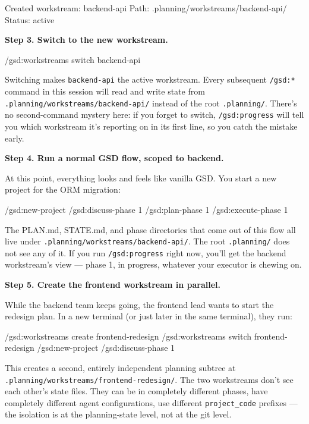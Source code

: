 \documentclass[11pt,letterpaper,openany]{book}
\begin{document}
\begin{gsdscenario}
\begin{gsdplain}
Created workstream: backend-api
Path: .planning/workstreams/backend-api/
Status: active
\end{gsdplain}

\textbf{Step 3. Switch to the new workstream.}

\begin{gsdbash}
/gsd:workstreams switch backend-api
\end{gsdbash}

\noindent
Switching makes \texttt{backend-api} the active workstream. Every
subsequent \texttt{/gsd:*} command in this session will read and
write state from \texttt{.planning/workstreams/backend-api/} instead
of the root \texttt{.planning/}. There's no second-command mystery
here: if you forget to switch, \texttt{/gsd:progress} will tell you
which workstream it's reporting on in its first line, so you catch
the mistake early.

\textbf{Step 4. Run a normal GSD flow, scoped to backend.}

At this point, everything looks and feels like vanilla GSD. You
start a new project for the ORM migration:

\begin{gsdbash}
/gsd:new-project
/gsd:discuss-phase 1
/gsd:plan-phase 1
/gsd:execute-phase 1
\end{gsdbash}

\noindent
The PLAN.md, STATE.md, and phase directories that come out of this
flow all live under \texttt{.planning/workstreams/backend-api/}.
The root \texttt{.planning/} does not see any of it. If you run
\texttt{/gsd:progress} right now, you'll get the backend workstream's
view --- phase 1, in progress, whatever your executor is chewing on.

\textbf{Step 5. Create the frontend workstream in parallel.}

While the backend team keeps going, the frontend lead wants to start
the redesign plan. In a new terminal (or just later in the same
terminal), they run:

\begin{gsdbash}
/gsd:workstreams create frontend-redesign
/gsd:workstreams switch frontend-redesign
/gsd:new-project
/gsd:discuss-phase 1
\end{gsdbash}

\noindent
This creates a second, entirely independent planning subtree at
\texttt{.planning/workstreams/frontend-redesign/}. The two workstreams
don't see each other's state files. They can be in completely
different phases, have completely different agent configurations,
use different \texttt{project\_code} prefixes --- the isolation is
at the planning-state level, not at the git level.


\end{gsdscenario}
\end{document}

